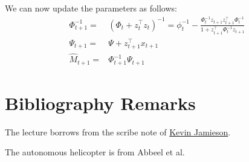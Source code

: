 We can now update the parameters as follows:
\begin{align*}
\Phi_{t+1}^{-1}=&(\Phi_t+z_t^\top z_t)^{-1} =
\phi_t^{-1}-\frac{\Phi_t^{-1}z_{t+1}z_{t+1}^\top\Phi_t^{-1}}{1+z_{t+1}^\top\Phi_t^{-1}z_{t+1}}\\
\Psi_{t+1}=&\Psi+z_{t+1}^\top x_{t+1}\\
\hat{M}_{t+1}=&\Phi_{t+1}^{-1}\Psi_{t+1}
\end{align*}



\section{Bibliography Remarks}

The lecture borrows from the scribe note of
\href{https://courses.cs.washington.edu/courses/cse599i/18wi/resources/lecture20/lecture20.pdf}{Kevin
Jamieson}.


The autonomous helicopter is from Abbeel et al. \cite{AbbeelCN2010}

%
%
